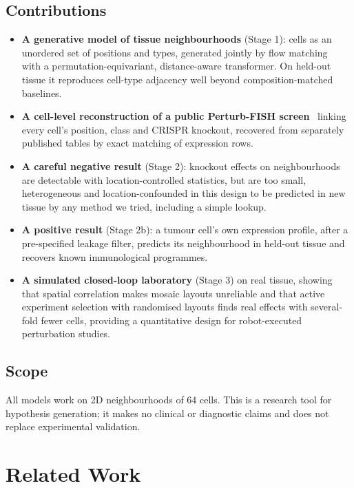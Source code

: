 \documentclass[journal]{IEEEtran}
\begin{document}
\subsection{Contributions}
\begin{itemize}
  \item \textbf{A generative model of tissue neighbourhoods} (Stage 1): cells as an unordered set of positions and types, generated jointly by flow matching~\cite{lipman2023,liu2023} with a permutation-equivariant, distance-aware transformer. On held-out tissue it reproduces cell-type adjacency well beyond composition-matched baselines.
  \item \textbf{A cell-level reconstruction of a public Perturb-FISH screen}~\cite{binan2025} linking every cell's position, class and CRISPR knockout, recovered from separately published tables by exact matching of expression rows.
  \item \textbf{A careful negative result} (Stage 2): knockout effects on neighbourhoods are detectable with location-controlled statistics, but are too small, heterogeneous and location-confounded in this design to be predicted in new tissue by any method we tried, including a simple lookup.
  \item \textbf{A positive result} (Stage 2b): a tumour cell's own expression profile, after a pre-specified leakage filter, predicts its neighbourhood in held-out tissue and recovers known immunological programmes.
  \item \textbf{A simulated closed-loop laboratory} (Stage 3) on real tissue, showing that spatial correlation makes mosaic layouts unreliable and that active experiment selection with randomised layouts finds real effects with several-fold fewer cells, providing a quantitative design for robot-executed perturbation studies.
\end{itemize}

\subsection{Scope}
All models work on 2D neighbourhoods of 64 cells. This is a research tool for hypothesis generation; it makes no clinical or diagnostic claims and does not replace experimental validation.

\section{Related Work}
\end{document}
